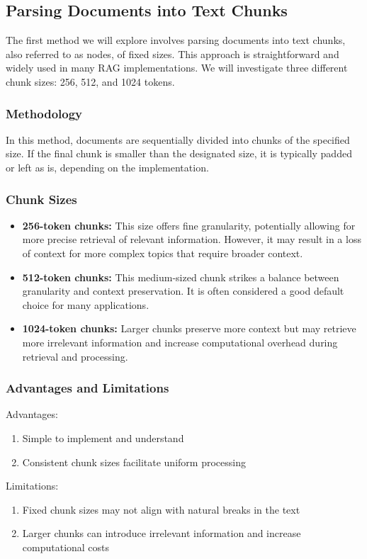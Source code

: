 \subsection{Parsing Documents into Text Chunks}\label{subsec:parsing-documents-into-text-chunks}
The first method we will explore involves parsing documents into text chunks, also referred to as nodes, of fixed sizes.
This approach is straightforward and widely used in many RAG implementations.
We will investigate three different chunk sizes: 256, 512, and 1024 tokens.
\subsubsection{Methodology}
In this method, documents are sequentially divided into chunks of the specified size.
If the final chunk is smaller than the designated size, it is typically padded or left as is, depending on the implementation.
\subsubsection{Chunk Sizes}
\begin{itemize}
    \item \textbf{256-token chunks:} This size offers fine granularity, potentially allowing for more precise retrieval of relevant information. However, it may result in a loss of context for more complex topics that require broader context.
    \item \textbf{512-token chunks:} This medium-sized chunk strikes a balance between granularity and context preservation. It is often considered a good default choice for many applications.
    \item \textbf{1024-token chunks:} Larger chunks preserve more context but may retrieve more irrelevant information and increase computational overhead during retrieval and processing.
\end{itemize}
\subsubsection{Advantages and Limitations}
Advantages:
\begin{enumerate}
    \item Simple to implement and understand
    \item Consistent chunk sizes facilitate uniform processing
\end{enumerate}
Limitations:
\begin{enumerate}
    \item Fixed chunk sizes may not align with natural breaks in the text
    \item Larger chunks can introduce irrelevant information and increase computational costs
\end{enumerate}
